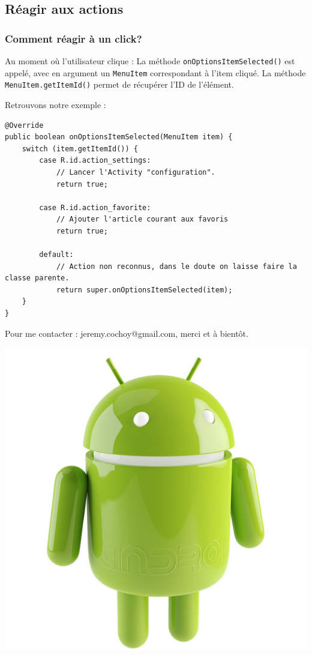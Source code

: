 \documentclass{beamer}
\begin{document}
\subsection{Réagir aux actions}

\begin{frame}
\frametitle{Comment réagir à un click?}
\begin{block}{Au moment où l'utilisateur clique :}
La méthode \verb!onOptionsItemSelected()! est appelé, avec en argument un \verb!MenuItem! correspondant à l'item cliqué. La méthode \verb!MenuItem.getItemId()! permet de récupérer l'ID de l'élément.
\end{block}
\end{frame}

\begin{frame}[fragile]
\begin{block}{Retrouvons notre exemple :}
\lstset{language=java}
\begin{lstlisting}
@Override
public boolean onOptionsItemSelected(MenuItem item) {
    switch (item.getItemId()) {
        case R.id.action_settings:
            // Lancer l'Activity "configuration".
            return true;

        case R.id.action_favorite:
            // Ajouter l'article courant aux favoris
            return true;

        default:
            // Action non reconnus, dans le doute on laisse faire la classe parente.
            return super.onOptionsItemSelected(item);
    }
}
\end{lstlisting}
\end{block}

\end{frame}

\begin{frame}
\begin{center}
Pour me contacter : jeremy.cochoy@gmail.com, merci et à bientôt.

\medskip
\medskip
\medskip
\medskip

\includegraphics[scale=0.18]{android.jpg}
\end{center}
\end{frame}
\end{document}
